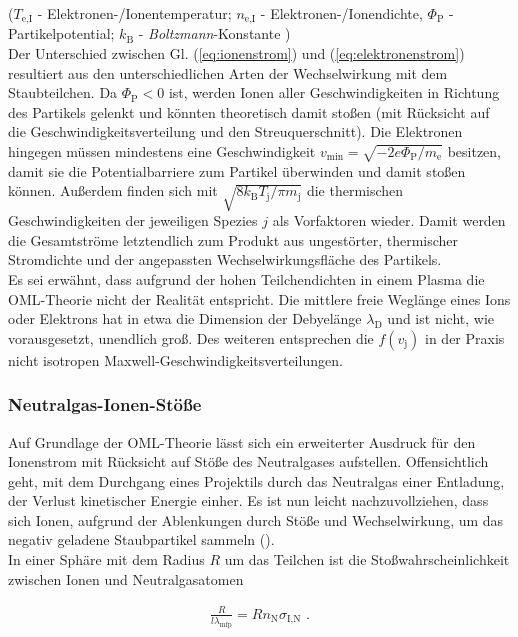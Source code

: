\documentclass[numbers=noenddot,a4paper]{scrartcl}
\newcommand{\ix}[1]{_\text{#1}}
\newcommand{\tilt}[1]{\textit{#1}}
\begin{document}
			($T\ix{e,I}$ - Elektronen-/Ionentemperatur; $n\ix{e,I}$ - Elektronen-/Ionendichte, $\Phi\ix{P}$ - Partikelpotential; $k\ix{B}$ - \tilt{Boltzmann}-Konstante )\\
			Der Unterschied zwischen Gl. (\ref{eq:ionenstrom}) und (\ref{eq:elektronenstrom}) resultiert aus den unterschiedlichen Arten der Wechselwirkung mit dem Staubteilchen. Da $\Phi\ix{P}<0$ ist, werden Ionen aller Geschwindigkeiten in Richtung des Partikels gelenkt und könnten theoretisch damit stoßen (mit Rücksicht auf die Geschwindigkeitsverteilung und den Streuquerschnitt). Die Elektronen hingegen müssen mindestens eine Geschwindigkeit $v\ix{min}=\sqrt{-2e\Phi\ix{P}/m\ix{e}}$ besitzen, damit sie die Potentialbarriere zum Partikel überwinden und damit stoßen können. Au{\ss}erdem finden sich mit $\sqrt{8k\ix{B}T\ix{j}/\pi m\ix{j}}$ die thermischen Geschwindigkeiten der jeweiligen Spezies $j$ als Vorfaktoren wieder. Damit werden die Gesamtstr\"ome letztendlich zum Produkt aus ungest\"orter, thermischer Stromdichte und der angepassten Wechselwirkungsfl\"ache des Partikels. \\
			Es sei erwähnt, dass aufgrund der hohen Teilchendichten in einem Plasma die OML-Theorie nicht der Realität entspricht. Die mittlere freie Weglänge eines Ions oder Elektrons hat in etwa die Dimension der Debyelänge $\lambda\ix{D}$ und ist nicht, wie vorausgesetzt, unendlich groß. Des weiteren entsprechen die $f\left(v\ix{j}\right)$ in der Praxis nicht isotropen Maxwell-Geschwindigkeitsverteilungen.

			\subsubsection{Neutralgas-Ionen-Stöße}

			Auf Grundlage der OML-Theorie lässt sich ein erweiterter Ausdruck für den Ionenstrom mit Rücksicht auf Stöße des Neutralgases aufstellen. Offensichtlich geht, mit dem Durchgang eines Projektils durch das Neutralgas einer Entladung, der Verlust kinetischer Energie einher. Es ist nun leicht nachzuvollziehen, dass sich Ionen, aufgrund der Ablenkungen durch Stöße und Wechselwirkung, um das negativ geladene Staubpartikel sammeln (\cite{Goree92}).\\
            In einer Sphäre mit dem Radius $R$ um das Teilchen ist die Stoßwahrscheinlichkeit zwischen Ionen und Neutralgasatomen

				\begin{align}
					\frac{R}{l\lambda\ix{mfp}}=Rn\ix{N}\sigma\ix{I,N} \,\, . \label{eq:wahrschein}
				\end{align}
\end{document}
